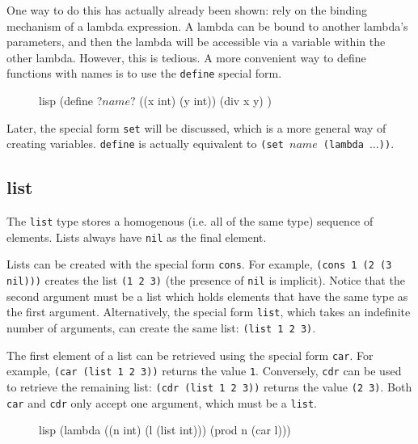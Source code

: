 \documentclass[a4paper, 12pt]{article}
\begin{document}
One way to do this has actually already been shown: rely on the binding mechanism of a lambda expression. A lambda can be bound to another lambda's parameters, and then the lambda will be accessible via a variable within the other lambda. However, this is tedious. A more convenient way to define functions with names is to use the \texttt{define} special form.

\begin{figure}[htp]
    \centering
    \begin{cminted}[autogobble=true, escapeinside=??]{lisp}
        (define ?$name$? ((x int) (y int))
          (div x y)
        )
    \end{cminted}
    \captionsetup[figure]{font=small}
\end{figure}

Later, the special form \texttt{set} will be discussed, which is a more general way of creating variables. \texttt{define} is actually equivalent to \texttt{(set $name$ (lambda $\ldots$))}.

\subsection{list}
The \texttt{list} type stores a homogenous (i.e. all of the same type) sequence of elements. Lists always have \texttt{nil} as the final element.

Lists can be created with the special form \texttt{cons}. For example, \texttt{(cons 1 (2 (3 nil)))} creates the list \texttt{(1 2 3)} (the presence of \texttt{nil} is implicit). Notice that the second argument must be a list which holds elements that have the same type as the first argument. Alternatively, the special form \texttt{list}, which takes an indefinite number of arguments, can create the same list: \texttt{(list 1 2 3)}.

The first element of a list can be retrieved using the special form \texttt{car}. For example, \texttt{(car (list 1 2 3))} returns the value \texttt{1}. Conversely, \texttt{cdr} can be used to retrieve the remaining list: \texttt{(cdr (list 1 2 3))} returns the value \texttt{(2 3)}. Both \texttt{car} and \texttt{cdr} only accept one argument, which must be a \texttt{list}.

\begin{figure}[htp]
    \centering
    \begin{cminted}[autogobble=true]{lisp}
        (lambda ((n int) (l (list int)))
          (prod n (car l)))
    \end{cminted}
    \captionsetup[figure]{font=small}
\end{figure}
\end{document}
